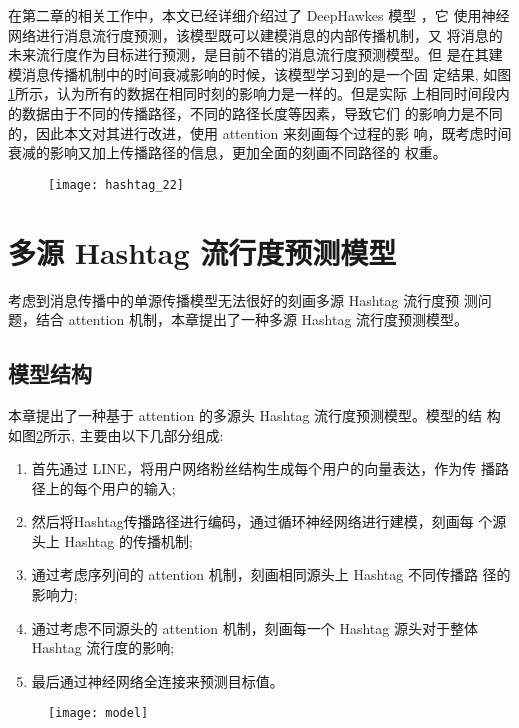 在第二章的相关工作中，本文已经详细介绍过了 DeepHawkes 模型 \citep{Cao2017DeepHawkes}，它 使用神经网络进行消息流行度预测，该模型既可以建模消息的内部传播机制，又 将消息的未来流行度作为目标进行预测，是目前不错的消息流行度预测模型。但 是在其建模消息传播机制中的时间衰减影响的时候，该模型学习到的是一个固 定结果, 如图\ref{fig:4_5}所示，认为所有的数据在相同时刻的影响力是一样的。但是实际
 上相同时间段内的数据由于不同的传播路径，不同的路径长度等因素，导致它们 的影响力是不同的，因此本文对其进行改进，使用 attention 来刻画每个过程的影 响，既考虑时间衰减的影响又加上传播路径的信息，更加全面的刻画不同路径的 权重。
\begin{figure}[H]
    \centering
    \texttt{[image: hashtag\_22]}
    \label{fig:4_5}
\end{figure}

\section{多源 Hashtag 流行度预测模型}
考虑到消息传播中的单源传播模型无法很好的刻画多源 Hashtag 流行度预
测问题，结合 attention 机制，本章提出了一种多源 Hashtag 流行度预测模型。
\subsection{模型结构}

本章提出了一种基于 attention 的多源头 Hashtag 流行度预测模型。模型的结 构如图\ref{fig:4_6}所示, 主要由以下几部分组成:

\begin{enumerate}
\item 首先通过 LINE，将用户网络粉丝结构生成每个用户的向量表达，作为传 播路径上的每个用户的输入;
\item 然后将Hashtag传播路径进行编码，通过循环神经网络进行建模，刻画每 个源头上 Hashtag 的传播机制;
\item 通过考虑序列间的 attention 机制，刻画相同源头上 Hashtag 不同传播路 径的影响力;
\item 通过考虑不同源头的 attention 机制，刻画每一个 Hashtag 源头对于整体 Hashtag 流行度的影响;
\item 最后通过神经网络全连接来预测目标值。

\end{enumerate}

\begin{figure}[H]
    \centering
    \texttt{[image: model]}
    \label{fig:4_6}
\end{figure}

